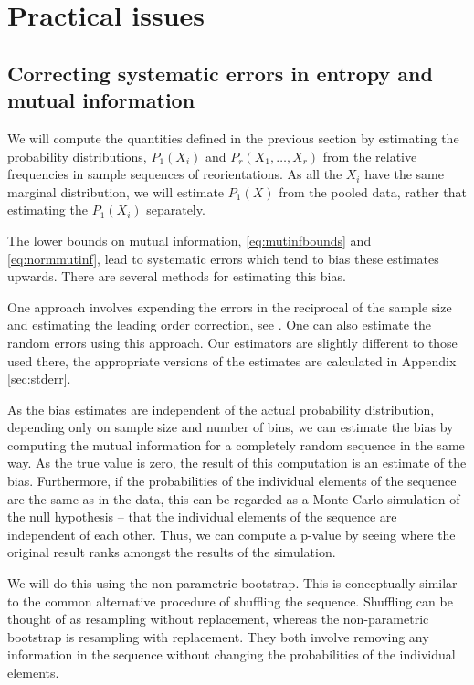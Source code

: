 \documentclass[12pt]{article}
\begin{document}
\section{Practical issues}\label{sec:practical}

\subsection{Correcting systematic errors in entropy and mutual information}\label{sec:syscorr}

We will compute the quantities defined in the previous section by estimating the probability distributions, $P_1(X_i)$ and $P_r(X_1,\ldots,X_r)$ from the relative frequencies in sample sequences of reorientations. As all the $X_i$ have the same marginal distribution, we will estimate $P_1(X)$ from the pooled data, rather that estimating the $P_1(X_i)$ separately.


The lower bounds on mutual information, \eqref{eq:mutinfbounds} and \eqref{eq:normmutinf}, lead to systematic errors which tend to bias these estimates upwards. There are several methods for estimating this bias.

One approach involves expending the errors in the reciprocal of the sample size and estimating the leading order correction, see \cite{Roulston1999}. One can also estimate the random errors using this approach. Our estimators are slightly different to those used there, the appropriate versions of the estimates are calculated in Appendix \ref{sec:stderr}.

As the bias estimates are independent of the actual probability distribution, depending only on sample size and number of bins, we can estimate the bias by computing the mutual information for a completely random sequence in the same way. As the true value is zero, the result of this computation is an estimate of the bias. Furthermore, if the probabilities of the individual elements of the sequence are the same as in the data, this can be regarded as a Monte-Carlo simulation of the null hypothesis -- that the individual elements of the sequence are independent of each other. Thus, we can compute a p-value by seeing where the original result ranks amongst the results of the simulation.

We will do this using the non-parametric bootstrap. This is conceptually similar to the common alternative procedure of shuffling the sequence. Shuffling can be thought of as resampling without replacement, whereas the non-parametric bootstrap is resampling with replacement. They both involve removing any information in the sequence without changing the probabilities of the individual elements.
\end{document}
